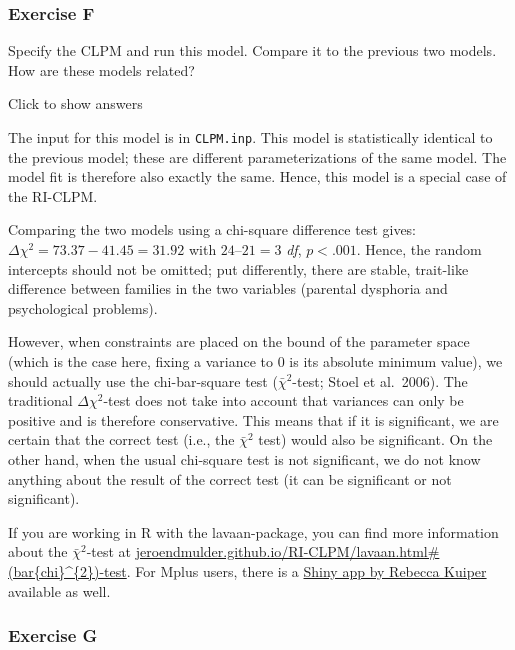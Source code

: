 \documentclass[
]{book}
\begin{document}
\hypertarget{exercise-f-1}{%
\subsubsection*{Exercise F}\label{exercise-f-1}}

Specify the CLPM and run this model. Compare it to the previous two models. How are these models related?

Click to show answers

The input for this model is in \texttt{CLPM.inp}. This model is statistically identical to the previous model; these are different parameterizations of the same model. The model fit is therefore also exactly the same. Hence, this model is a special case of the RI-CLPM.

Comparing the two models using a chi-square difference test gives: \(\Delta \chi^{2} = 73.37 - 41.45 = 31.92\) with \(24 – 21 = 3\) \emph{df}, \(p < .001\). Hence, the random intercepts should not be omitted; put differently, there are stable, trait-like difference between families in the two variables (parental dysphoria and psychological problems).

However, when constraints are placed on the bound of the parameter space (which is the case here, fixing a variance to 0 is its absolute minimum value), we should actually use the chi-bar-square test (\(\bar{\chi}^{2}\)-test; Stoel et al.~2006). The traditional \(\Delta \chi^{2}\)-test does not take into account that variances can only be positive and is therefore conservative. This means that if it is significant, we are certain that the correct test (i.e., the \(\bar{\chi}^{2}\) test) would also be significant. On the other hand, when the usual chi‐square test is not significant, we do not know anything about the result of the correct test (it can be significant or not significant).

If you are working in R with the lavaan-package, you can find more information about the \(\bar{\chi}^{2}\)-test at \href{https://jeroendmulder.github.io/RI-CLPM/lavaan.html\#(bar\%7Bchi\%7D\%5E\%7B2\%7D)-test}{jeroendmulder.github.io/RI-CLPM/lavaan.html\#(bar\{chi\}\^{}\{2\})-test}. For Mplus users, there is a \href{https://www.uu.nl/staff/RMKuiper/Websites\%20\%2F\%20Shiny\%20apps}{Shiny app by Rebecca Kuiper} available as well.

\hypertarget{exercise-g-1}{%
\subsubsection*{Exercise G}\label{exercise-g-1}}
\end{document}
